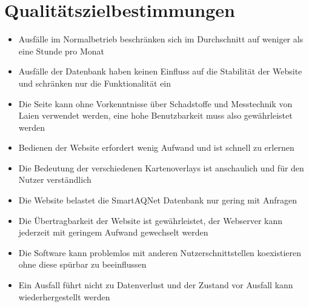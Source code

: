 \section{Qualitätszielbestimmungen}
\begin{itemize}
    \item Ausfälle im Normalbetrieb beschränken sich im Durchschnitt auf weniger als eine Stunde pro Monat
    \item Ausfälle der Datenbank haben keinen Einfluss auf die Stabilität der Website und schränken nur die Funktionalität ein
    \item Die Seite kann ohne Vorkenntnisse über Schadstoffe und Messtechnik von Laien verwendet werden, eine hohe Benutzbarkeit muss also gewährleistet werden
    \item Bedienen der Website erfordert wenig Aufwand und ist schnell zu erlernen
    \item Die Bedeutung der verschiedenen Kartenoverlays ist anschaulich und für den Nutzer verständlich
    \item Die Website belastet die SmartAQNet Datenbank nur gering mit Anfragen
    \item Die Übertragbarkeit der Website ist gewährleistet, der Webserver kann jederzeit mit geringem Aufwand gewechselt werden
    \item Die Software kann problemlos mit anderen Nutzerschnittstellen koexistieren ohne diese spürbar zu beeinflussen
    \item Ein Ausfall führt nicht zu Datenverlust und der Zustand vor Ausfall kann wiederhergestellt werden
\end{itemize}